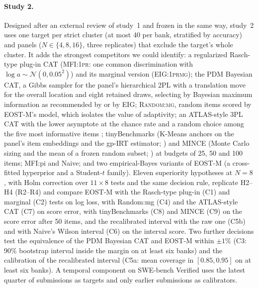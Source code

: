 \paragraph{Study 2.} Designed after an external review of study~1 and frozen in the same way,
study~2 uses one target per strict cluster (at most 40 per bank, stratified by accuracy) and
panels ($N\in\{4,8,16\}$, three replicates) that exclude the target's whole cluster. It
adds the strongest competitors we could identify: a regularized Rasch-type plug-in CAT
(\textsc{MFI:1pr}: one common discrimination with $\log a\sim\mathcal N(0,0.05^2)$) and its
marginal version (\textsc{EIG:1prmg}); the PDM Bayesian CAT, a Gibbs sampler for the
panel's hierarchical 2PL with a translation move for the overall location and eight
retained draws, selecting by Bayesian maximum information as recommended by
\citet{fink2025accounting} or by EIG; \textsc{Random:mg}, random items scored by EOST-M's
model, which isolates the value of adaptivity; an ATLAS-style 3PL CAT \citep{li2026atlas}
with the lower asymptote at the chance rate and a random choice among the five most
informative items \citep{kingsbury1989procedures}; tinyBenchmarks (K-Means anchors on the
panel's item embeddings and the gp-IRT estimator; \citealp{polo2024tinybenchmarks}) and
MINCE (Monte Carlo sizing and the mean of a frozen random subset; \citealp{das2026mince}) at
budgets of 25, 50 and 100 items; MFI:pi and Naive; and two empirical-Bayes variants of
EOST-M (a cross-fitted hyperprior and a Student-$t$ family). Eleven superiority hypotheses at
$N=8$, with Holm correction over $11\times8$ tests and the same decision rule, replicate H2--H4
(R2--R4) and compare EOST-M with the Rasch-type plug-in (C1) and marginal (C2) tests on log
loss, with Random:mg (C4) and the ATLAS-style CAT (C7) on score error, with tinyBenchmarks
(C8) and MINCE (C9) on the score error after 50 items, and the recalibrated interval with
the raw one (C5b) and with Naive's Wilson interval (C6) on the interval score. Two further
decisions test the equivalence of the PDM Bayesian CAT and EOST-M within $\pm1\%$ (C3:
90\% bootstrap interval inside the margin on at least six banks) and the calibration of the
recalibrated interval (C5a: mean coverage in $[0.85,0.95]$ on at least six banks). A temporal
component on SWE-bench Verified uses the latest quarter of submissions as targets and only
earlier submissions as calibrators.

